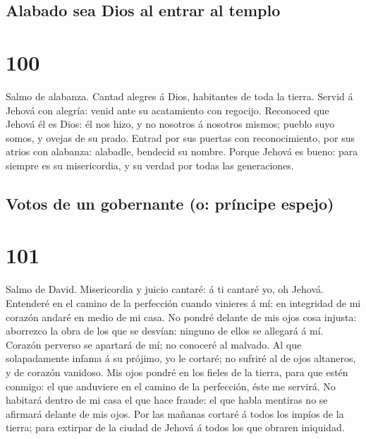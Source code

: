 \hypertarget{alabado-sea-dios-al-entrar-al-templo}{%
\subsection{Alabado sea Dios al entrar al
templo}\label{alabado-sea-dios-al-entrar-al-templo}}

\hypertarget{section-99}{%
\section{100}\label{section-99}}

 Salmo de alabanza. Cantad alegres á Dios, habitantes de
toda la tierra.  Servid á Jehová con alegría: venid ante
su acatamiento con regocijo.  Reconoced que Jehová él es
Dios: él nos hizo, y no nosotros á nosotros mismos; pueblo suyo somos, y
ovejas de su prado.  Entrad por sus puertas con
reconocimiento, por sus atrios con alabanza: alabadle, bendecid su
nombre.  Porque Jehová es bueno: para siempre es su
misericordia, y su verdad por todas las generaciones.

\hypertarget{votos-de-un-gobernante-o-pruxedncipe-espejo}{%
\subsection{Votos de un gobernante (o: príncipe
espejo)}\label{votos-de-un-gobernante-o-pruxedncipe-espejo}}

\hypertarget{section-100}{%
\section{101}\label{section-100}}

 Salmo de David. Misericordia y juicio cantaré: á ti
cantaré yo, oh Jehová.  Entenderé en el camino de la
perfección cuando vinieres á mí: en integridad de mi corazón andaré en
medio de mi casa.  No pondré delante de mis ojos cosa
injusta: aborrezco la obra de los que se desvían: ninguno de ellos se
allegará á mí.  Corazón perverso se apartará de mí; no
conoceré al malvado.  Al que solapadamente infama á su
prójimo, yo le cortaré; no sufriré al de ojos altaneros, y de corazón
vanidoso.  Mis ojos pondré en los fieles de la tierra,
para que estén conmigo: el que anduviere en el camino de la perfección,
éste me servirá.  No habitará dentro de mi casa el que
hace fraude: el que habla mentiras no se afirmará delante de mis ojos.
 Por las mañanas cortaré á todos los impíos de la tierra;
para extirpar de la ciudad de Jehová á todos los que obraren iniquidad.

